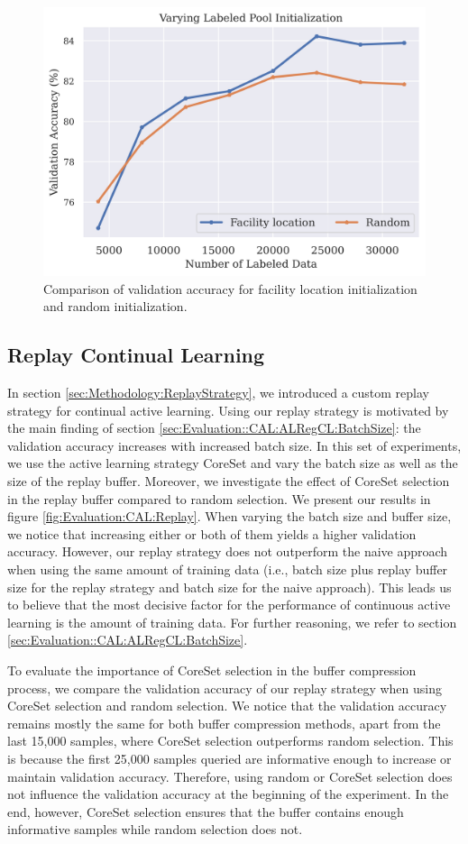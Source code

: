 \begin{figure}[h]
    \centering
    \includegraphics[width=0.6\linewidth]{images/results_CAL/Facility_location_init.png}
    \caption{Comparison of validation accuracy for facility location initialization and random initialization.}
    \label{fig:Evaluation:CAL:FLinit}
\end{figure}


\subsection{Replay Continual Learning}
\label{sec:Evaluation:CAL:Replay}
In section \ref{sec:Methodology:ReplayStrategy}, we introduced a custom replay strategy for continual active learning. Using our replay strategy is motivated by the main
finding of section \ref{sec:Evaluation::CAL:ALRegCL:BatchSize}: the validation accuracy increases with increased batch size. In this set of experiments, we use the active
learning strategy CoreSet and vary the batch size as well as the size of the replay buffer. Moreover, we investigate the effect of CoreSet selection in the replay buffer
compared to random selection. We present our results in figure \ref{fig:Evaluation:CAL:Replay}. When varying the batch size and buffer size, we notice that increasing either
or both of them yields a higher validation accuracy. However, our replay strategy does not outperform the naive approach when using the same amount of training data
(i.e., batch size plus replay buffer size for the replay strategy and batch size for the naive approach). This leads us to believe that the most decisive factor for the performance
of continuous active learning is the amount of training data. For further reasoning, we refer to section \ref{sec:Evaluation::CAL:ALRegCL:BatchSize}. \par
To evaluate the importance of CoreSet selection in the buffer compression process, we compare the validation accuracy of our replay strategy when using CoreSet selection and
random selection. We notice that the validation accuracy remains mostly the same for both buffer compression methods, apart from the last 15,000 samples, where CoreSet selection
outperforms random selection. This is because the first 25,000 samples queried are informative enough to increase or maintain validation accuracy. Therefore, using random or
CoreSet selection does not influence the validation accuracy at the beginning of the experiment. In the end, however, CoreSet selection ensures that the buffer contains
enough informative samples while random selection does not. \par


